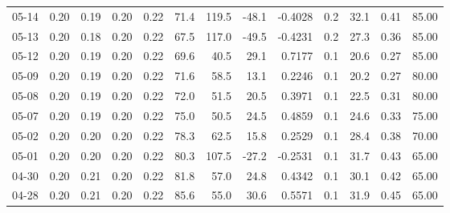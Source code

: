 \begin{threeparttable}
{\begin{tabular}{lrrrrrrrrrrrr}
  05-14 &          0.20 &          0.19 &          0.20 &        0.22 &                71.4 &               119.5 &      -48.1 &      -0.4028 &                 0.2 &             32.1 &            0.41 &                  85.00 \\
  05-13 &          0.20 &          0.18 &          0.20 &        0.22 &                67.5 &               117.0 &      -49.5 &      -0.4231 &                 0.2 &             27.3 &            0.36 &                  85.00 \\
  05-12 &          0.20 &          0.19 &          0.20 &        0.22 &                69.6 &                40.5 &       29.1 &       0.7177 &                 0.1 &             20.6 &            0.27 &                  85.00 \\
  05-09 &          0.20 &          0.19 &          0.20 &        0.22 &                71.6 &                58.5 &       13.1 &       0.2246 &                 0.1 &             20.2 &            0.27 &                  80.00 \\
  05-08 &          0.20 &          0.19 &          0.20 &        0.22 &                72.0 &                51.5 &       20.5 &       0.3971 &                 0.1 &             22.5 &            0.31 &                  80.00 \\
  05-07 &          0.20 &          0.19 &          0.20 &        0.22 &                75.0 &                50.5 &       24.5 &       0.4859 &                 0.1 &             24.6 &            0.33 &                  75.00 \\
  05-02 &          0.20 &          0.20 &          0.20 &        0.22 &                78.3 &                62.5 &       15.8 &       0.2529 &                 0.1 &             28.4 &            0.38 &                  70.00 \\
  05-01 &          0.20 &          0.20 &          0.20 &        0.22 &                80.3 &               107.5 &      -27.2 &      -0.2531 &                 0.1 &             31.7 &            0.43 &                  65.00 \\
  04-30 &          0.20 &          0.21 &          0.20 &        0.22 &                81.8 &                57.0 &       24.8 &       0.4342 &                 0.1 &             30.1 &            0.42 &                  65.00 \\
  04-28 &          0.20 &          0.21 &          0.20 &        0.22 &                85.6 &                55.0 &       30.6 &       0.5571 &                 0.1 &             31.9 &            0.45 &                  65.00 \\

\end{tabular}}
\end{threeparttable}
